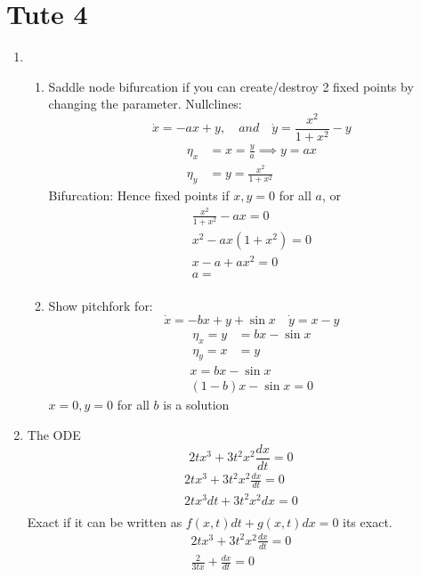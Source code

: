 \documentclass{X:/Documents/Coding/Latex/myassignment}
\begin{document}
\clearpage
\section{Tute 4}
\begin{enumerate}
    \item 
    \begin{enumerate}
        \item Saddle node bifurcation if you can create/destroy 2 fixed points by changing the parameter. Nullclines:
        \[\dot{x} = -ax + y,\quad and \quad \dot{y} = \frac{x^2}{1+x^2} - y\]
        \begin{align*}
            \eta_x &= x =\frac{y}a \implies y = ax \\
            \eta_y &= y = \frac{x^2}{1+x^2}
        \end{align*}
        Bifurcation:
        Hence fixed points if $x,y=0$ for all $a$, or 
        \begin{align*}            
        \frac{x^2}{1+x^2} - ax= 0\\
        x^2 - ax(1+x^2) = 0\\
        x - a + ax^2 = 0\\
        a = \frac{}{}
        \end{align*}
        \item Show pitchfork for:
        \[\dot x  =-bx + y + \sin x \quad \dot y = x-y\]
        \begin{align*}
           \eta_x = y &= bx-\sin x\\
           \eta_y = x&=y
        \end{align*}
        \begin{align*}
            x = bx - \sin x\\
            (1-b)x - \sin x = 0
        \end{align*}
        $x=0,y=0$ for all $b$ is a solution
    \end{enumerate}
    \item The ODE
    \[2tx^3 + 3t^2x^2 \frac{dx}{dt} = 0\]
    \begin{align*}
        2tx^3 + 3t^2x^2 \frac{dx}{dt} = 0\\
        2tx^3dt + 3t^2x^2 dx= 0\\
    \end{align*}
    Exact if it can be written as $f(x,t)dt + g(x,t)dx = 0$ its exact.
    \begin{align*}
        2tx^3 + 3t^2x^2 \frac{dx}{dt} = 0\\
        \frac{2}{3tx} + \frac{dx}{dt} = 0\\

\end{align*}
\end{enumerate}
\end{document}
